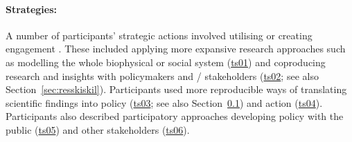\paragraph{Strategies:} A number of participants' strategic actions involved utilising or creating engagement \skitech. These included applying more expansive research approaches such as modelling the whole biophysical or social system (\hyperref[tab:resskitechstrat]{ts01}) and coproducing research and insights with policymakers and / stakeholders (\hyperref[tab:resskitechstrat]{ts02}; see also Section~\ref{sec:resskiskil}). Participants used more reproducible ways of translating scientific findings into policy \skifram{} (\hyperref[tab:resskitechstrat]{ts03}; see also Section~\ref{sec:resskifram}) and action (\hyperref[tab:resskitechstrat]{ts04}). Participants also described participatory approaches developing policy with the public (\hyperref[tab:resskitechstrat]{ts05}) and other stakeholders (\hyperref[tab:resskitechstrat]{ts06}).

\subsection{\titfram}\label{sec:resskifram}

